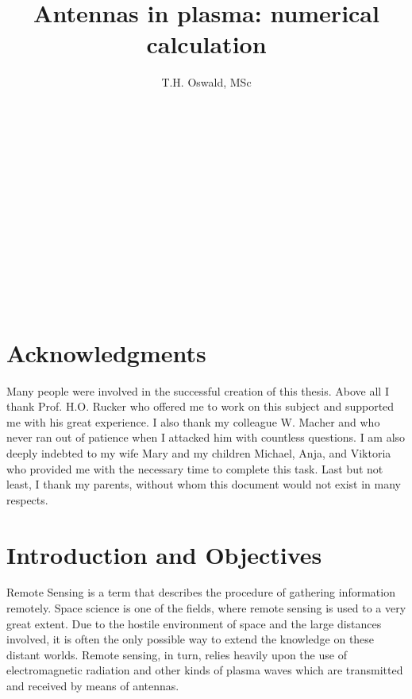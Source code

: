 \documentclass[a4paper,11pt]{thesis}
\title{Antennas in plasma: numerical calculation}
\author{T.H. Oswald, MSc}
\begin{document}
\maketitle

\newpage
\paragraph*{}
 \begin{verbatim}












\end{verbatim}
\begin{center}
\end{center}
\frontmatter
\chapter{\textbf{Acknowledgments}}
Many people were involved in the successful creation of this thesis. Above all I thank Prof. H.O. Rucker who offered me to work on this subject and supported me with his great experience. I also thank my colleague W. Macher and who never ran out of patience when I attacked him with countless questions. I am also deeply indebted to my wife Mary and my children Michael, Anja, and Viktoria who provided me with the necessary time to complete this task. Last but not least, I thank my parents, without whom this document would not exist in many respects.

\tableofcontents

\mainmatter
\chapter{Introduction and Objectives}
Remote Sensing is a term that describes the procedure of gathering information remotely. Space science is one of the fields, where remote sensing is used to a very great extent. Due to the hostile environment of space and the large distances involved, it is often the only possible way to extend the knowledge on these distant worlds. Remote sensing, in turn, relies heavily upon the use of electromagnetic radiation and other kinds of plasma waves which are transmitted and received by means of antennas.\\
\end{document}
